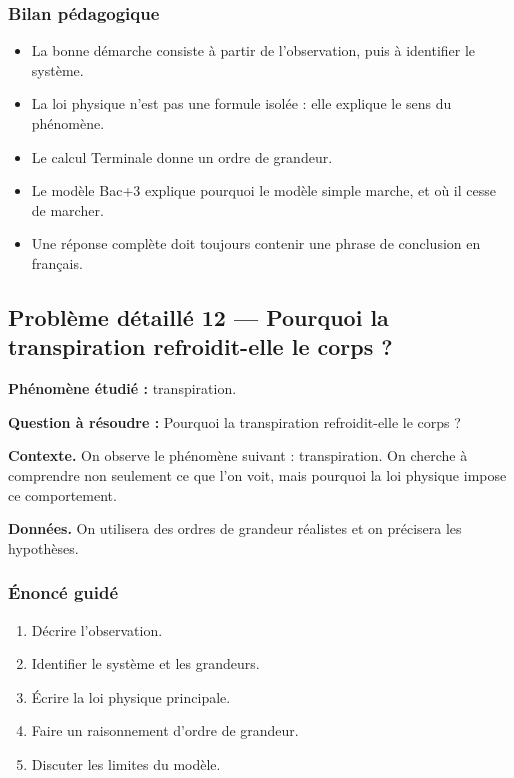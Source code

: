 \documentclass[11pt,a4paper]{article}
\begin{document}
\subsubsection*{Bilan pédagogique}

\begin{methodebox}
\begin{itemize}
  \item La bonne démarche consiste à partir de l'observation, puis à identifier le système.
  \item La loi physique n'est pas une formule isolée : elle explique le sens du phénomène.
  \item Le calcul Terminale donne un ordre de grandeur.
  \item Le modèle Bac+3 explique pourquoi le modèle simple marche, et où il cesse de marcher.
  \item Une réponse complète doit toujours contenir une phrase de conclusion en français.
\end{itemize}
\end{methodebox}

\subsection{Problème détaillé 12 — Pourquoi la transpiration refroidit-elle le corps ?}

\begin{exercicebox}
\textbf{Phénomène étudié :} transpiration.

\medskip
\textbf{Question à résoudre :} Pourquoi la transpiration refroidit-elle le corps ?

\medskip
\textbf{Contexte.} On observe le phénomène suivant : transpiration. On cherche à comprendre non seulement ce que l'on voit, mais pourquoi la loi physique impose ce comportement.

\medskip
\textbf{Données.} On utilisera des ordres de grandeur réalistes et on précisera les hypothèses.
\end{exercicebox}

\subsubsection*{Énoncé guidé}

\begin{enumerate}
  \item Décrire l'observation.
  \item Identifier le système et les grandeurs.
  \item Écrire la loi physique principale.
  \item Faire un raisonnement d'ordre de grandeur.
  \item Discuter les limites du modèle.
\end{enumerate}
\end{document}

